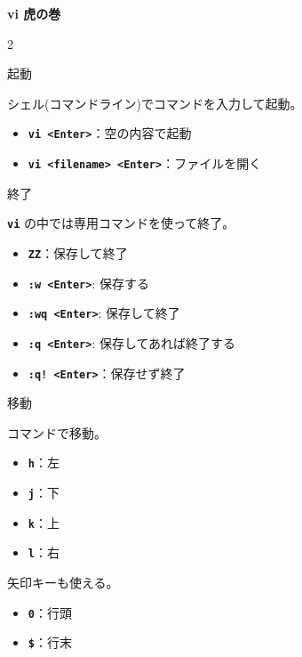 



\begin{center}
  {\LARGE\bfseries vi 虎の巻} 
\end{center}

\begin{multicols}{2}

\begin{cheatbox}{起動}
\begin{small}
シェル(コマンドライン)でコマンドを入力して起動。
\end{small}
\begin{itemize}
  \item \texttt{\bfseries vi <Enter>}：空の内容で起動
  \item \texttt{\bfseries vi <filename> <Enter>}：ファイルを開く
\end{itemize}
\end{cheatbox}

\begin{cheatbox}{終了}
\begin{small}
\texttt{\bfseries vi} の中では専用コマンドを使って終了。
\end{small}
\begin{itemize}
  \item \texttt{\bfseries ZZ}：保存して終了
  \item \texttt{\bfseries :w <Enter>}: 保存する
  \item \texttt{\bfseries :wq <Enter>}: 保存して終了
  \item \texttt{\bfseries :q <Enter>}: 保存してあれば終了する
  \item \texttt{\bfseries :q! <Enter>}：保存せず終了
\end{itemize}
\end{cheatbox}

\begin{cheatbox}{移動}
\begin{small}
コマンドで移動。
\end{small}
\begin{itemize}
  \item \texttt{\bfseries h}：左
  \item \texttt{\bfseries j}：下
  \item \texttt{\bfseries k}：上
  \item \texttt{\bfseries l}：右
\end{itemize}
\begin{small}
矢印キーも使える。
\end{small}
\begin{itemize}
  \item \texttt{\bfseries 0}：行頭
  \item \texttt{\bfseries \$}：行末
\end{itemize}
\end{cheatbox}


\end{multicols}
